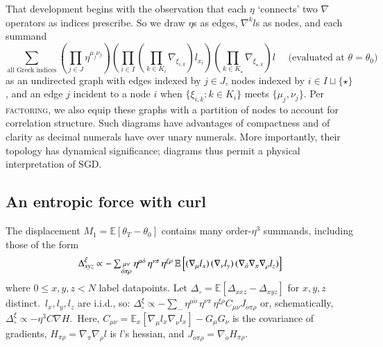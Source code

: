 \documentclass[anon,12pt]{colt2021} %
\newcommand{\squish}{\vspace{-0.05cm}}
\newcommand{\squash}{\vspace{-0.15cm}}
\newcommand{\wrap}[1]{\left(#1\right)}
\newcommand{\expc}{\mathbb{E}}
\newcommand{\expct}[1]{\mathbb{E}\left[#1\right]}
\newcommand{\omicron}{{\acute{o}}}
\begin{document}
            That development begins with the observation that each $\eta$
            `connects' two $\nabla$ operators as indices prescribe.  So we
            draw
            $\eta$s as edges, $\nabla^k l$s as nodes, and each
            summand
            $$
                \sum_{\text{all Greek indices}} \wrap{\prod_{j\in J} \eta^{\mu_j\nu_j}}
                \wrap{\prod_{i\in I} \wrap{\prod_{k\in K_i} \nabla_{\xi_{i,k}}}
                l_{x_i}} \wrap{\prod_{k\in K_\star} \nabla_{\xi_{\star,k}}}
                l\,\,\,\,\,\,\,\,\text{(evaluated at $\theta=\theta_0$)}
            $$
            as an undirected graph with edges indexed by $j\in J$, nodes
            indexed by $i\in I\sqcup \{\star\}$, and an edge $j$ incident
            to a node $i$ when $\{\xi_{i,k}:k\in K_i\}$ meets
            $\{\mu_j,\nu_j\}$.  Per \textsc{factoring}, we also equip these
            graphs with a partition of nodes to account for correlation
            structure.
            Such diagrams have advantages of compactness and of clarity as
            decimal numerals have over unary numerals.  More importantly,
            their topology has dynamical significance; diagrams thus permit a
            physical interpretation of SGD.

        \subsection{An entropic force with curl}\label{sect:entropic-curl}
            The displacement $M_1=\expc[\theta_T - \theta_0]$ contains many
            order-$\eta^3$ summands, including those of the form\squash
            $$
                \textstyle
                \Delta^\xi_{xyz} \propto 
                -
                \sum_{\substack{\mu\nu    \\ \omicron\pi\rho}}
                    \eta^{\mu\omicron} \, \eta^{\nu\pi} \, \eta^{\xi\rho}
                    \,
                \expct{
                    (\nabla_\mu l_x)
                    \,
                    (\nabla_\nu l_y)
                    \,
                    (\nabla_\omicron\nabla_\pi\nabla_\rho l_z)
                }
                \squash
            $$
            where $0\leq x,y,z<N$ label datapoints.
            Let $\Delta_\circ = \expc[\Delta_{xxz}-\Delta_{xyz}]$ for $x,y,z$
            distinct.\squash\  $l_x, l_y, l_z$ are i.i.d., so:
            $ 
                \Delta_\circ^\xi \propto 
                -
                \sum_{\cdots}
                \eta^{\mu\omicron} \, \eta^{\nu\pi} \, \eta^{\xi\rho}
                C_{\mu\nu} J_{\omicron\pi\rho}
            $
            or, schematically, 
                $\boxed{\Delta_\circ^\xi
                \propto -\eta^3 C\nabla H}$.\squish\ 
            Here, $C_{\mu\nu} = \expc_x[\nabla_{\mu} l_x \nabla_{\nu} l_x] - G_\mu G_\nu$ is the covariance of gradients,
            $H_{\pi\rho} = \nabla_\pi\nabla_\rho l$ is $l$'s hessian, and
            $J_{\omicron\pi\rho} = \nabla_\omicron H_{\pi\rho}$.
\end{document}

